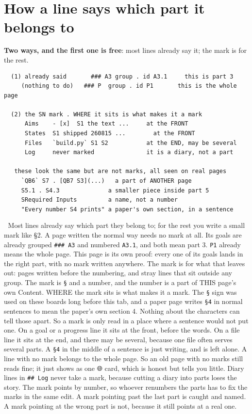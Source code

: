 
\section{How a line says which part it belongs to}
\textbf{Two ways, and the first one is free}: most lines already say it; the mark is for the rest.

\begin{verbatim}
  (1) already said       ### A3 group . id A3.1     this is part 3
     (nothing to do)   ### P  group . id P1       this is the whole page

  (2) the SN mark . WHERE it sits is what makes it a mark
      Aims    - [x]  S1 the text ...     at the FRONT
      States  S1 shipped 260815 ...        at the FRONT
      Files   `build.py` S1 S2           at the END, may be several
      Log     never marked               it is a diary, not a part

   these look the same but are not marks, all seen on real pages
     `QB6` S7 . [QB7 S3](...)   a part of ANOTHER page
     S5.1 . S4.3              a smaller piece inside part 5
     SRequired Inputs         a name, not a number
     "Every number S4 prints" a paper's own section, in a sentence
\end{verbatim}
📌 Most lines already say which part they belong to; for the rest you write a small mark like §2. A page written the normal way needs no mark at all. Its goals are already grouped \texttt{\#\#\# A3} and numbered \texttt{A3.1}, and both mean part 3. \texttt{P1} already means the whole page. This page is its own proof: every one of its goals lands in the right part, with no mark written anywhere. The mark is for what that leaves out: pages written before the numbering, and stray lines that sit outside any group. The mark is \texttt{§} and a number, and the number is a part of THIS page's own Content. WHERE the mark sits is what makes it a mark. The \texttt{§} sign was used on these boards long before this tab, and a paper page writes \texttt{§4} in normal sentences to mean the paper's own section 4. Nothing about the characters can tell those apart. So a mark is only read in a place where a sentence would not put one. On a goal or a progress line it sits at the front, before the words. On a file line it sits at the end, and there may be several, because one file often serves several parts. A \texttt{§4} in the middle of a sentence is just writing, and is left alone. A line with no mark belongs to the whole page. So an old page with no marks still reads fine; it just shows as one 🌐 card, which is honest but tells you little. Diary lines in \texttt{\#\# Log} never take a mark, because cutting a diary into parts loses the story. The mark points by number, so whoever renumbers the parts has to fix the marks in the same edit. A mark pointing past the last part is caught and named. A mark pointing at the wrong part is not, because it still points at a real one.


